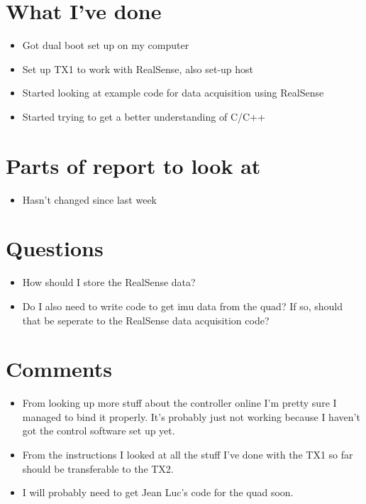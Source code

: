 \documentclass[12pt,a4paper]{article}
\begin{document}
\author{Katrina Ashton}


\pagestyle{fancy}
\fancyhf{}
\rhead{\thepage}

\section{What I've done}
\begin{itemize}
\item{Got dual boot set up on my computer}
\item{Set up TX1 to work with RealSense, also set-up host}
\item{Started looking at example code for data acquisition using RealSense}
\item{Started trying to get a better understanding of C/C++}
\end{itemize}

\section{Parts of report to look at}
\begin{itemize}
\item{Hasn't changed since last week}
\end{itemize}

\section{Questions}
\begin{itemize}
\item{How should I store the RealSense data?}
\item{Do I also need to write code to get imu data from the quad? If so, should that be seperate to the RealSense data acquisition code?}
\end{itemize}

\section{Comments}
\begin{itemize}
\item{From looking up more stuff about the controller online I'm pretty sure I managed to bind it properly. It's probably just not working because I haven't got the control software set up yet.}
\item{From the instructions I looked at all the stuff I've done with the TX1 so far should be transferable to the TX2.}
\item{I will probably need to get Jean Luc's code for the quad soon.}
\end{itemize}
\end{document}
